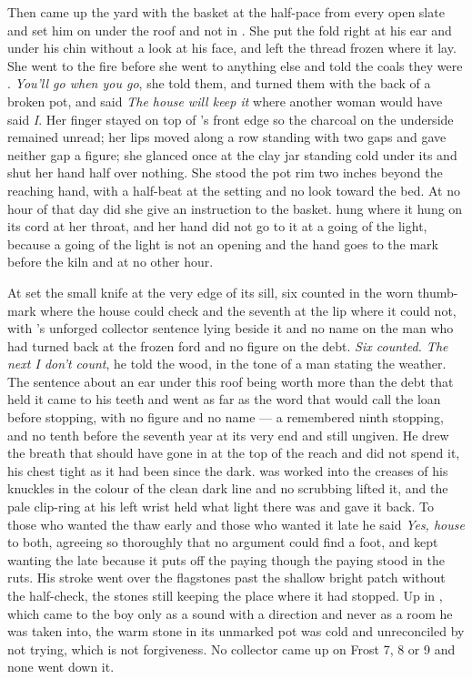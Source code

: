 Then  came up the yard with the basket at the half-pace from every open slate and set him on  under the roof and not in . She put the fold right at his ear and under his chin without a look at his face, and left the thread frozen where it lay. She went to the fire before she went to anything else and told the coals they were . \emph{You'll go when you go}, she told them, and turned them with the back of a broken pot, and said \emph{The house will keep it} where another woman would have said \emph{I}. Her finger stayed on top of 's front edge so the charcoal on the underside remained unread; her lips moved along a row standing with two gaps and gave neither gap a figure; she glanced once at the clay jar standing cold under its  and shut her hand half over nothing. She stood the pot rim two inches beyond the reaching hand, with a half-beat at the setting and no look toward the bed. At no hour of that day did she give an instruction to the basket.  hung where it hung on its cord at her throat, and her hand did not go to it at a going of the light, because a going of the light is not an opening and the hand goes to the mark before the kiln and at no other hour.

\scenebreak

At   set the small knife at the very edge of its sill, six counted in the worn thumb-mark where the house could check and the seventh at the lip where it could not, with 's unforged collector sentence lying beside it and no name on the man who had turned back at the frozen ford and no figure on the debt. \emph{Six counted. The next I don't count}, he told the wood, in the tone of a man stating the weather. The sentence about an ear under this roof being worth more than the debt that held it came to his teeth and went as far as the word that would call the loan before stopping, with no figure and no name --- a remembered ninth stopping, and no tenth before the seventh year at its very end and still ungiven. He drew the breath that should have gone in at the top of the reach and did not spend it, his chest tight as it had been since the dark.  was worked into the creases of his knuckles in the colour of the clean dark line and no scrubbing lifted it, and the pale clip-ring at his left wrist held what light there was and gave it back. To those who wanted the thaw early and those who wanted it late he said \emph{Yes, house} to both, agreeing so thoroughly that no argument could find a foot, and kept wanting the late because it puts off the paying though the paying stood in the ruts. His stroke went over the flagstones past the shallow bright patch without the half-check, the stones still keeping the place where it had stopped. Up in , which came to the boy only as a sound with a direction and never as a room he was taken into, the warm stone in its unmarked pot was cold and unreconciled by not trying, which is not forgiveness. No collector came up  on Frost 7, 8 or 9 and none went down it.

